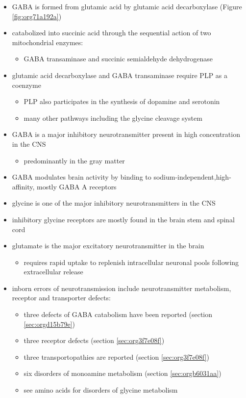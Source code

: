 \documentclass{scrartcl}
\begin{document}
\begin{itemize}
\item GABA is formed from glutamic acid by glutamic acid decarboxylase
(Figure \ref{fig:org71a192a})
\item catabolized into succinic acid through the sequential action of two
mitochondrial enzymes:
\begin{itemize}
\item GABA transaminase and succinic semialdehyde dehydrogenase
\end{itemize}
\item glutamic acid decarboxylase and GABA transaminase require PLP as a coenzyme
\begin{itemize}
\item PLP also participates in the synthesis of dopamine and serotonin
\item many other pathways including the glycine cleavage system
\end{itemize}
\item GABA is a major inhibitory neurotransmitter present in high
concentration in the CNS
\begin{itemize}
\item predominantly in the gray matter
\end{itemize}
\item GABA modulates brain activity by binding to
sodium-independent,high-affinity, mostly GABA A receptors
\item glycine is one of the major inhibitory neurotransmitters in the CNS
\item inhibitory glycine receptors are mostly found in the brain stem
and spinal cord
\item glutamate is the major excitatory neurotransmitter in the brain
\begin{itemize}
\item requires rapid uptake to replenish intracellular
neuronal pools following extracellular release
\end{itemize}
\item inborn errors of neurotransmission include neurotransmitter
metabolism, receptor and transporter defects:
\begin{itemize}
\item three defects of GABA catabolism have been reported (section \ref{sec:orgd15b79e})
\item three receptor defects (section \ref{sec:org3f7e08f})
\item three transportopathies are reported (section \ref{sec:org3f7e08f})
\item six disorders of monoamine metabolism (section \ref{sec:orgb6031aa})
\item see amino acids for disorders of glycine metabolism
\end{itemize}
\end{itemize}
\end{document}
